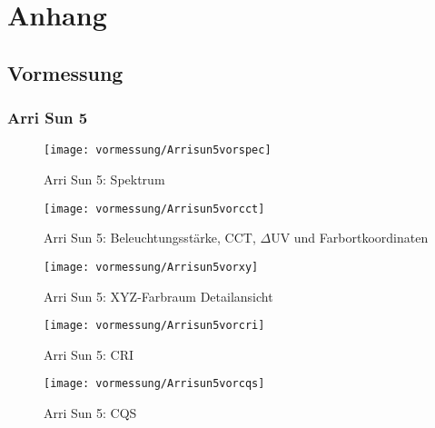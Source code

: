 \documentclass[pagesize,paper=A4,fontsize=12pt,utf8,numbers=noenddot,bibliography=totoc,listof=totoc,DIV=11,BCOR=1mm]{scrreprt}
\begin{document}
\chapter{Anhang}

\section{Vormessung}


\subsection{Arri Sun 5}

\begin{figure}[htp]     %
\centering
\texttt{[image: vormessung/Arrisun5vorspec]} 
\caption {Arri Sun 5: Spektrum} 
\end{figure}

\begin{figure}[htp]     %
\centering
\texttt{[image: vormessung/Arrisun5vorcct]} 
\caption {Arri Sun 5: Beleuchtungsstärke, CCT, $\Delta$UV und Farbortkoordinaten} 
\end{figure}

\begin{figure}[htp]     %
\centering
\texttt{[image: vormessung/Arrisun5vorxy]} 
\caption {Arri Sun 5: XYZ-Farbraum Detailansicht} 
\end{figure}

\begin{figure}[htp]     %
\centering
\texttt{[image: vormessung/Arrisun5vorcri]} 
\caption {Arri Sun 5: CRI} 
\end{figure}

\begin{figure}[htp]     %
\centering
\texttt{[image: vormessung/Arrisun5vorcqs]} 
\caption {Arri Sun 5: CQS} 
\end{figure}
\end{document}
